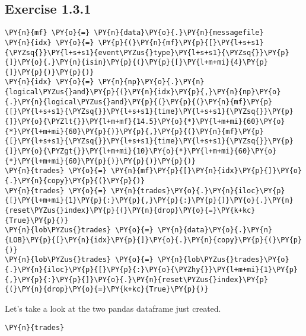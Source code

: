 \documentclass[11pt]{article}
\begin{document}
    \hypertarget{exercise-1.3.1}{%
\subsection*{Exercise 1.3.1}\label{exercise-1.3.1}}

    \begin{tcolorbox}[breakable, size=fbox, boxrule=1pt, pad at break*=1mm,colback=cellbackground, colframe=cellborder]
\begin{Verbatim}[commandchars=\\\{\}]
\PY{n}{mf} \PY{o}{=} \PY{n}{data}\PY{o}{.}\PY{n}{messagefile}
\PY{n}{idx} \PY{o}{=} \PY{p}{(}\PY{n}{mf}\PY{p}{[}\PY{l+s+s1}{\PYZsq{}}\PY{l+s+s1}{event\PYZus{}type}\PY{l+s+s1}{\PYZsq{}}\PY{p}{]}\PY{o}{.}\PY{n}{isin}\PY{p}{(}\PY{p}{[}\PY{l+m+mi}{4}\PY{p}{]}\PY{p}{)}\PY{p}{)}
\PY{n}{idx} \PY{o}{=} \PY{n}{np}\PY{o}{.}\PY{n}{logical\PYZus{}and}\PY{p}{(}\PY{n}{idx}\PY{p}{,}\PY{n}{np}\PY{o}{.}\PY{n}{logical\PYZus{}and}\PY{p}{(}\PY{p}{(}\PY{n}{mf}\PY{p}{[}\PY{l+s+s1}{\PYZsq{}}\PY{l+s+s1}{time}\PY{l+s+s1}{\PYZsq{}}\PY{p}{]}\PY{o}{\PYZlt{}}\PY{l+m+mf}{14.5}\PY{o}{*}\PY{l+m+mi}{60}\PY{o}{*}\PY{l+m+mi}{60}\PY{p}{)}\PY{p}{,}\PY{p}{(}\PY{n}{mf}\PY{p}{[}\PY{l+s+s1}{\PYZsq{}}\PY{l+s+s1}{time}\PY{l+s+s1}{\PYZsq{}}\PY{p}{]}\PY{o}{\PYZgt{}}\PY{l+m+mi}{10}\PY{o}{*}\PY{l+m+mi}{60}\PY{o}{*}\PY{l+m+mi}{60}\PY{p}{)}\PY{p}{)}\PY{p}{)}
\PY{n}{trades} \PY{o}{=} \PY{n}{mf}\PY{p}{[}\PY{n}{idx}\PY{p}{]}\PY{o}{.}\PY{n}{copy}\PY{p}{(}\PY{p}{)}
\PY{n}{trades} \PY{o}{=} \PY{n}{trades}\PY{o}{.}\PY{n}{iloc}\PY{p}{[}\PY{l+m+mi}{1}\PY{p}{:}\PY{p}{,}\PY{p}{:}\PY{p}{]}\PY{o}{.}\PY{n}{reset\PYZus{}index}\PY{p}{(}\PY{n}{drop}\PY{o}{=}\PY{k+kc}{True}\PY{p}{)}
\PY{n}{lob\PYZus{}trades} \PY{o}{=} \PY{n}{data}\PY{o}{.}\PY{n}{LOB}\PY{p}{[}\PY{n}{idx}\PY{p}{]}\PY{o}{.}\PY{n}{copy}\PY{p}{(}\PY{p}{)}
\PY{n}{lob\PYZus{}trades} \PY{o}{=} \PY{n}{lob\PYZus{}trades}\PY{o}{.}\PY{n}{iloc}\PY{p}{[}\PY{p}{:}\PY{o}{\PYZhy{}}\PY{l+m+mi}{1}\PY{p}{,}\PY{p}{:}\PY{p}{]}\PY{o}{.}\PY{n}{reset\PYZus{}index}\PY{p}{(}\PY{n}{drop}\PY{o}{=}\PY{k+kc}{True}\PY{p}{)}
\end{Verbatim}
\end{tcolorbox}

    Let's take a look at the two pandas dataframe just created.

    \begin{tcolorbox}[breakable, size=fbox, boxrule=1pt, pad at break*=1mm,colback=cellbackground, colframe=cellborder]
\begin{Verbatim}[commandchars=\\\{\}]
\PY{n}{trades}
\end{Verbatim}
\end{tcolorbox}
\end{document}

